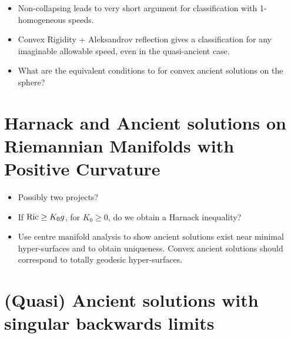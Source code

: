 \documentclass{amsart}
\begin{document}
\begin{itemize}
\item Non-collapsing leads to very short argument for classification with 1-homogeneous speeds.
\item Convex Rigidity + Aleksandrov reflection gives a classification for any imaginable allowable speed, even in the quasi-ancient case.
\item What are the equivalent conditions to \cite{2014arXiv1405.7509H} for convex ancient solutions on the sphere?
\end{itemize}

\section{Harnack and Ancient solutions on Riemannian Manifolds with Positive Curvature}

\begin{itemize}
\item Possibly two projects?
\item If $\operatorname{\text{Ric}} \geq K_0 g$, for $K_0 \geq 0$, do we obtain a Harnack inequality?
\item Use centre manifold analysis to show ancient solutions exist near minimal hyper-surfaces and to obtain uniqueness. Convex ancient solutions should correspond to totally geodesic hyper-surfaces.
\end{itemize}

\section{(Quasi) Ancient solutions with singular backwards limits}
\end{document}
